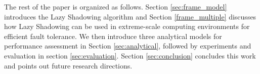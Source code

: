 The rest of the paper is organized as follows. %
Section \ref{sec:frame_model} introduces the Lazy Shadowing algorithm and Section \ref{frame_multiple} discusses how Lazy Shadowing can be used in 
extreme-scale computing environments for efficient fault tolerance. 
We then introduce three analytical models for performance assessment
in Section \ref{sec:analytical}, 
followed by experiments and evaluation in
section \ref{sec:evaluation}. Section \ref{sec:conclusion} concludes this work and points out 
future research directions.

